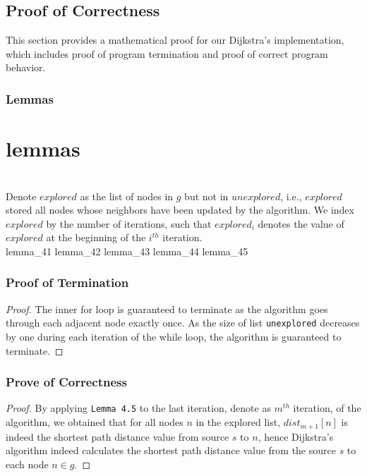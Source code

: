 \subsection{Proof of Correctness} \label{mathematical_proof}
This section provides a mathematical proof for our Dijkstra's implementation, which includes proof of program termination and proof of correct program behavior.

\subsubsection{Lemmas} \section{lemmas}
\tab\\
Denote $explored$ as the list of nodes in $g$ but not in $unexplored$, i.e., $explored$ stored all nodes whose neighbors have been updated by the algorithm. We index $explored$ by the number of iterations, such that $explored_i$ denotes the value of $explored$ at the beginning of the $i^{th}$ iteration.
\tab\\
{lemma_41}
{lemma_42}
{lemma_43}
{lemma_44}
{lemma_45}
{}
\subsubsection{Proof of Termination} 
\begin{proof}{}
The inner for loop is guaranteed to terminate as the algorithm goes through each adjacent node exactly once. As the size of list \texttt{unexplored} decreases by one during each iteration of the while loop, the algorithm is guaranteed to terminate. 
\end{proof}

\subsubsection{Prove of Correctness}
\begin{proof}
By applying \texttt{Lemma 4.5} to the last iteration, denote as $m^{th}$ iteration, of the algorithm, we obtained that for all nodes $n$ in the explored list, $dist_{m+1}[n]$ is indeed the shortest path distance value from source $s$ to $n$, hence Dijkstra's algorithm indeed calculates the shortest path distance value from the source $s$ to each node $n \in g$. 
\end{proof}